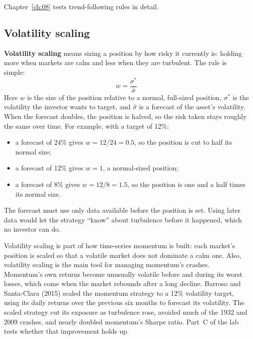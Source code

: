 Chapter~\ref{ch:08} tests trend-following rules in detail.


\subsection{Volatility scaling}

\textbf{Volatility scaling} means sizing a position by how risky it currently is: holding more when markets are calm and less when they are turbulent. The rule is simple:
\begin{equation}
  w = \frac{\sigma^*}{\hat\sigma}
  \label{eq:05-volscale}
\end{equation}
Here $w$ is the size of the position relative to a normal, full-sized position, $\sigma^*$ is the volatility the investor wants to target, and $\hat\sigma$ is a forecast of the asset's volatility. When the forecast doubles, the position is halved, so the risk taken stays roughly the same over time. For example, with a target of 12\%:

\begin{itemize}
  \item a forecast of 24\% gives $w = 12/24 = 0.5$, so the position is cut to half its normal size;
  \item a forecast of 12\% gives $w = 1$, a normal-sized position;
  \item a forecast of 8\% gives $w = 12/8 = 1.5$, so the position is one and a half times its normal size.
\end{itemize}

The forecast must use only data available before the position is set. Using later data would let the strategy ``know'' about turbulence before it happened, which no investor can do.

Volatility scaling is part of how time-series momentum is built: each market's position is scaled so that a volatile market does not dominate a calm one. 
Also, volatility scaling is the main tool for managing momentum's crashes. Momentum's own returns become unusually volatile before and during its worst losses, which come when the market rebounds after a long decline. Barroso and Santa-Clara (2015) scaled the momentum strategy to a 12\% volatility target, using its daily returns over the previous six months to forecast its volatility. The scaled strategy cut its exposure as turbulence rose, avoided much of the 1932 and 2009 crashes, and nearly doubled momentum's Sharpe ratio. Part~C of the lab tests whether that improvement holds up.

